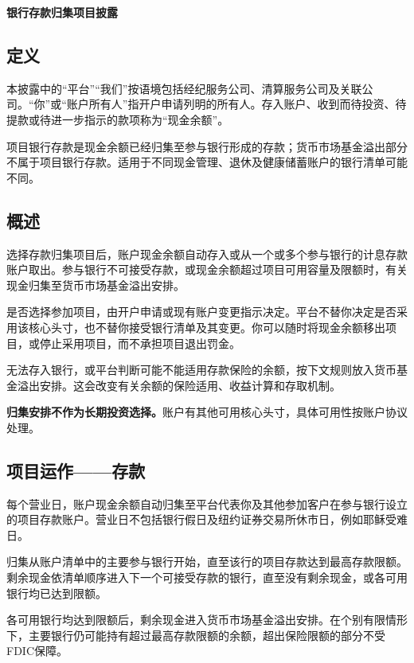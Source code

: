 \documentclass[UTF8,fontset=none,11pt,a4paper]{ctexart}
\begin{document}
{\noindent\fontsize{20}{25}\selectfont\bfseries 银行存款归集项目披露\par}
\vspace{10pt}
\subsection*{定义}
本披露中的“平台”“我们”按语境包括经纪服务公司、清算服务公司及关联公司。“你”或“账户所有人”指开户申请列明的所有人。存入账户、收到而待投资、待提款或待进一步指示的款项称为“现金余额”。


项目银行存款是现金余额已经归集至参与银行形成的存款；货币市场基金溢出部分不属于项目银行存款。适用于不同现金管理、退休及健康储蓄账户的银行清单可能不同。


\subsection*{概述}
选择存款归集项目后，账户现金余额自动存入或从一个或多个参与银行的计息存款账户取出。参与银行不可接受存款，或现金余额超过项目可用容量及限额时，有关现金归集至货币市场基金溢出安排。


是否选择参加项目，由开户申请或现有账户变更指示决定。平台不替你决定是否采用该核心头寸，也不替你接受银行清单及其变更。你可以随时将现金余额移出项目，或停止采用项目，而不承担项目退出罚金。


无法存入银行，或平台判断可能不能适用存款保险的余额，按下文规则放入货币基金溢出安排。这会改变有关余额的保险适用、收益计算和存取机制。


\textbf{归集安排不作为长期投资选择。}账户有其他可用核心头寸，具体可用性按账户协议处理。


\subsection*{项目运作——存款}
每个营业日，账户现金余额自动归集至平台代表你及其他参加客户在参与银行设立的项目存款账户。营业日不包括银行假日及纽约证券交易所休市日，例如耶稣受难日。


归集从账户清单中的主要参与银行开始，直至该行的项目存款达到最高存款限额。剩余现金依清单顺序进入下一个可接受存款的银行，直至没有剩余现金，或各可用银行均已达到限额。


各可用银行均达到限额后，剩余现金进入货币市场基金溢出安排。在个别有限情形下，主要银行仍可能持有超过最高存款限额的余额，超出保险限额的部分不受FDIC保障。
\end{document}
